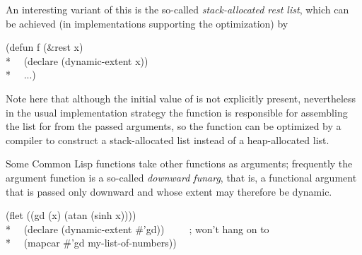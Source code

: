 \begin{newer}
\begin{flushdesc}
  An interesting variant of this is the so-called \emph{stack-allocated rest list},
  which can be achieved (in implementations supporting the optimization) by
\begin{lisp}
(defun f (\&rest x) \\*
~~(declare (dynamic-extent x)) \\*
~~...)
\end{lisp}
  Note here that although the initial value of  is not explicitly present,
  nevertheless in the usual implementation strategy the
  function  is responsible for assembling the list for  from the passed arguments,
  so the  function can be optimized by a compiler to construct a 
  stack-allocated list instead of a heap-allocated list.

Some Common Lisp functions take other functions as arguments; frequently
the argument function is a so-called \emph{downward funarg}, that is, a functional
argument that is passed only downward and whose extent may therefore be dynamic.
\begin{lisp}
(flet ((gd (x) (atan (sinh x)))) \\*
~~(declare (dynamic-extent \#'gd))~~~~~;\textrm{ won't hang on to }\\*
~~(mapcar \#'gd my-list-of-numbers))
\end{lisp}



\end{flushdesc}
\end{newer}
